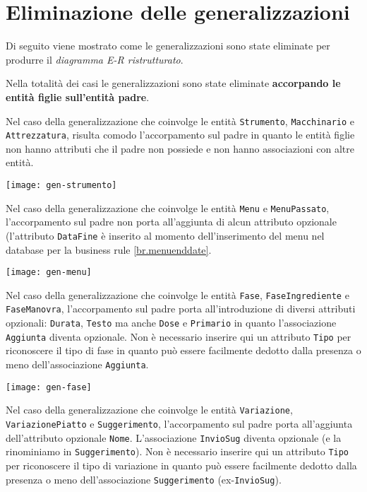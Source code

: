 \section{Eliminazione delle generalizzazioni}\label{sec:generalizations}
Di seguito viene mostrato come le generalizzazioni sono state eliminate per produrre
il {\it diagramma E-R ristrutturato}.

Nella totalità dei casi le generalizzazioni sono state eliminate {\bf accorpando
le entità figlie sull'entità padre}.

\vspace{15pt}

Nel caso della generalizzazione che coinvolge le entità {\tt Strumento}, {\tt Macchinario}
e {\tt Attrezzatura}, risulta comodo l'accorpamento sul padre in quanto le entità figlie
non hanno attributi che il padre non possiede e non hanno associazioni con altre entità.

\vspace{5pt}\centerline{\texttt{[image: gen-strumento]}}

\vspace{15pt}

Nel caso della generalizzazione che coinvolge le entità {\tt Menu} e  {\tt MenuPassato},
l'accorpamento sul padre non porta all'aggiunta di alcun attributo opzionale (l'attributo
{\tt DataFine} è inserito al momento dell'inserimento del menu nel database per la business rule \ref{br.menuenddate}.

\vspace{5pt}\centerline{\texttt{[image: gen-menu]}}

\vspace{15pt}

Nel caso della generalizzazione che coinvolge le entità {\tt Fase}, {\tt FaseIngrediente}
e {\tt FaseManovra}, l'accorpamento sul padre porta all'introduzione di diversi attributi
opzionali: {\tt Durata}, {\tt Testo} ma anche {\tt Dose} e {\tt Primario} in quanto l'associazione
{\tt Aggiunta} diventa opzionale. Non è necessario inserire qui un attributo {\tt Tipo} per
riconoscere il tipo di fase in quanto può essere facilmente dedotto dalla presenza o meno
dell'associazione {\tt Aggiunta}.

\vspace{5pt}\centerline{\texttt{[image: gen-fase]}}

\vspace{15pt}

Nel caso della generalizzazione che coinvolge le entità {\tt Variazione}, {\tt VariazionePiatto}
e {\tt Suggerimento}, l'accorpamento sul padre porta all'aggiunta dell'attributo opzionale
{\tt Nome}. L'associazione {\tt InvioSug} diventa opzionale (e la rinominiamo in {\tt Suggerimento}).
Non è necessario inserire qui un attributo {\tt Tipo} per riconoscere il tipo di variazione
in quanto può essere facilmente dedotto dalla presenza o meno dell'associazione {\tt Suggerimento} (\hbox{ex-\texttt{InvioSug}}).

